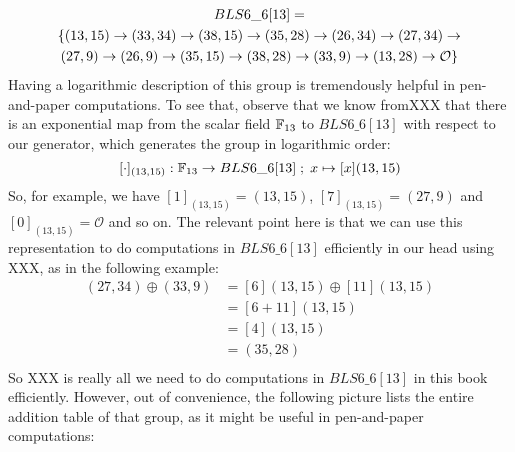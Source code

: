 \begin{multline}
\label{BLS6-G1-log}
BLS6\_6[13]=\\
\{(13,15) \rightarrow (33,34) \rightarrow  (38,15) \rightarrow  (35,28) \rightarrow (26,34) \rightarrow  (27,34) \rightarrow  \\ 
(27,9)  \rightarrow  (26,9) \rightarrow  (35,15) \rightarrow  (38,28) \rightarrow  (33,9) \rightarrow (13,28) \rightarrow  \mathcal{O}\}$$
\end{multline}
Having a logarithmic description of this group is tremendously helpful in pen-and-paper computations. To see that, observe that we know fromXXX that there is an exponential map from the scalar field $\mathbb{F}_{13}$ to $BLS6\_6[13]$ with respect to our generator, which generates the group in logarithmic order:
$$
[\cdot]_{(13,15)}: \mathbb{F}_{13} \to BLS6\_6[13]\;;\; x \mapsto [x](13,15)
$$
 So, for example, we have $[1]_{(13,15)}= (13,15)$, $[7]_{(13,15)}= (27,9)$ and $[0]_{(13,15)}= \mathcal{O}$ and so on. The relevant point here is that we can use this representation to do computations in $BLS6\_6[13]$ efficiently in our head using XXX, as in the following example:
\begin{align*}
(27,34)\oplus (33,9)  & = [6](13,15)\oplus [11](13,15)\\
                      & = [6+11](13,15)\\
                      & = [4](13,15)\\
                      & = (35,28)\\
\end{align*}
So XXX is really all we need to do computations in $BLS6\_6[13]$ in this book efficiently. However, out of convenience, the following picture lists the entire addition table of that group, as it might be useful in pen-and-paper computations:
\begingroup
    \fontsize{7pt}{7pt}\selectfont
